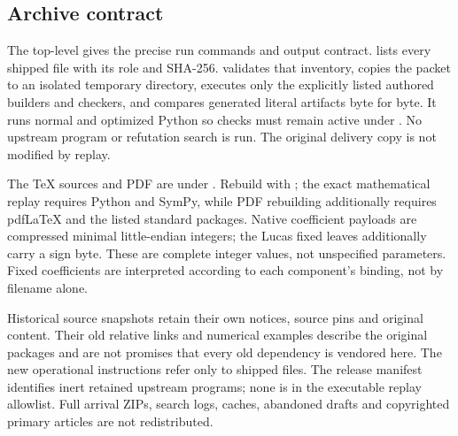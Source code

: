 \subsection{Archive contract}
The top-level  gives the precise run commands and output
contract.  lists every shipped file with its role and
SHA-256.  validates that inventory, copies the packet to
an isolated temporary directory, executes only the explicitly listed
authored builders and checkers, and compares generated literal artifacts
byte for byte. It runs normal and optimized Python so checks must remain
active under . No upstream program or refutation search is run.
The original delivery copy is not modified by replay.

The TeX sources and PDF are under . Rebuild with
; the exact mathematical replay requires Python
and SymPy, while PDF rebuilding additionally requires pdfLaTeX and the
listed standard packages. Native coefficient payloads are compressed
minimal little-endian integers; the Lucas fixed leaves additionally
carry a sign byte. These are complete integer values, not unspecified
parameters. Fixed coefficients are interpreted according to each
component's binding, not by filename alone.

Historical source snapshots retain their own notices, source pins and
original content. Their old relative links and numerical examples describe
the original packages and are not promises that every old dependency is
vendored here. The new operational instructions refer only to shipped
files. The release manifest identifies inert retained upstream programs;
none is in the executable replay allowlist. Full arrival ZIPs, search
logs, caches, abandoned drafts and copyrighted primary articles are not
redistributed.
